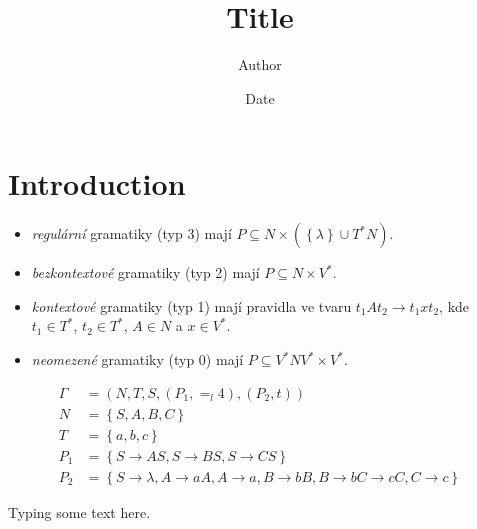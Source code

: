 \documentclass{article}
\title{Title}
\author{Author}
\date{Date}
\begin{document}
\maketitle

\section{Introduction}

\begin{itemize}
    \item \textit{regulární} gramatiky (typ 3) mají
        $P \subseteq N \times \left(\left\{\lambda\right\} \cup T^*N\right)$.
    \item \textit{bezkontextové} gramatiky (typ 2) mají
        $P \subseteq N \times V^*$.
    \item \textit{kontextové} gramatiky (typ 1) mají pravidla ve tvaru
        $t_1At_2 \rightarrow t_1xt_2$, kde $t_1 \in T^*$, $t_2 \in T^*$,
        $A \in N$ a $x \in V^*$.
    \item \textit{neomezené} gramatiky (typ 0) mají
        $P \subseteq V^*NV^* \times V^*$.
\end{itemize}

\begin{align*}
    \Gamma &= (N, T, S, (P_1, =_l4), (P_2, t)) \\
    N      &= \left\{ S, A, B, C \right\} \\
    T      &= \left\{ a, b, c \right\} \\
    P_1    &= \left\{
        S \rightarrow AS, S \rightarrow BS, S \rightarrow CS
    \right\} \\
    P_2    &= \left\{
        S \rightarrow \lambda,
        A \rightarrow aA, A \rightarrow a,
        B \rightarrow bB, B \rightarrow b
        C \rightarrow cC, C \rightarrow c
    \right\}
\end{align*}

Typing some text here.
\end{document}
